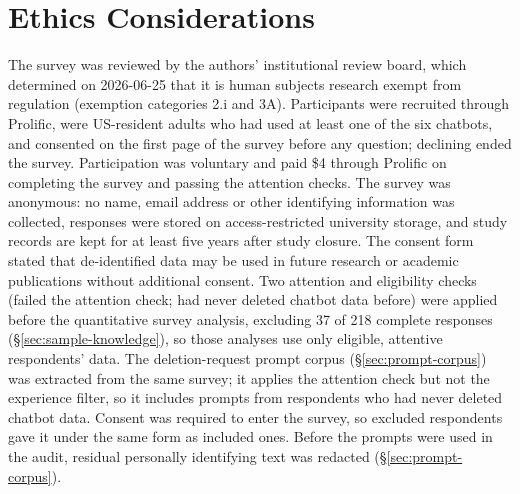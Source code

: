 \documentclass[conference,compsoc]{IEEEtran}
\begin{document}
\section*{Ethics Considerations}
The survey was reviewed by the authors' institutional review board, which
determined on 2026-06-25 that it is human subjects research exempt from
regulation (exemption categories 2.i and 3A). Participants were recruited through Prolific, were
US-resident adults who had used at least one of the six chatbots, and
consented on the first page of the survey before any question; declining
ended the survey. Participation was voluntary and paid \$4 through
Prolific on completing the survey and passing the attention checks. The
survey was anonymous: no name, email address or other identifying
information was collected, responses were stored on access-restricted
university storage, and study records are kept for at least five years after
study closure. The consent form stated that de-identified data may be used
in future research or academic publications without additional consent.
Two attention and eligibility checks (failed the attention check; had never
deleted chatbot data before) were applied before the quantitative survey
analysis, excluding 37 of 218 complete responses
(\S\ref{sec:sample-knowledge}), so those analyses use only eligible,
attentive respondents' data. The deletion-request prompt corpus
(\S\ref{sec:prompt-corpus}) was extracted from the same survey; it applies the
attention check but not the experience filter, so it includes prompts from
respondents who had never deleted chatbot data. Consent was required to enter the survey, so excluded respondents gave it
under the same form as included ones. Before the prompts were used in the
audit, residual personally identifying text was redacted (\S\ref{sec:prompt-corpus}).
\end{document}

